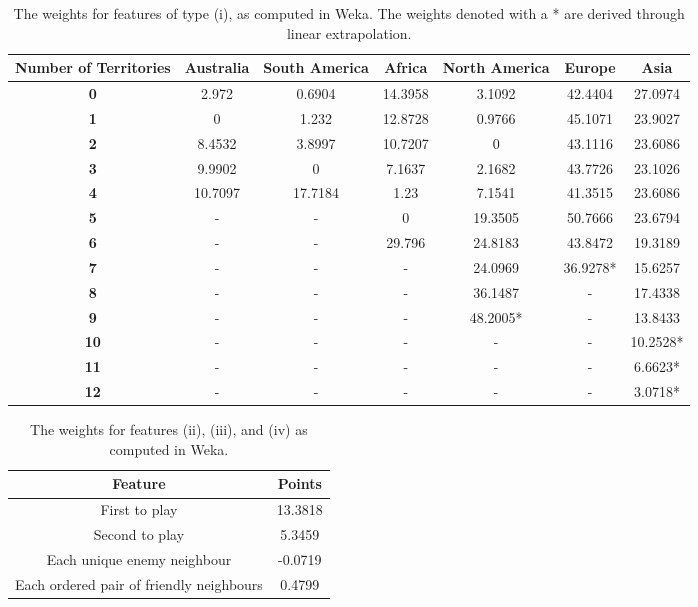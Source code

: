 \documentclass[letterpaper]{article}
\numberwithin{equation}{section}
\numberwithin{theorem}{section}
\numberwithin{lemma}{section}
\numberwithin{df}{section}
\begin{document}
\begin{table}[t]
  \begin{center} 
   \caption{The weights for features of type (i), as computed in Weka.  The weights denoted with a * are derived through linear extrapolation.}
    \label{tab:ContScoring}
    \begin{tabular}{|c|c|c|c|c|c|c|}
    	\hline
    	\bf Number of Territories & \bf Australia & \bf South America & \bf Africa & \bf North America & \bf Europe & \bf Asia \\
    	\hline
    	\bf 0 & 2.972 & 0.6904 & 14.3958 & 3.1092 & 42.4404 & 27.0974 \\
    	\hline
    	\bf 1 & 0 & 1.232 & 12.8728 & 0.9766 & 45.1071 & 23.9027 \\
    	\hline
    	\bf 2 & 8.4532 & 3.8997 & 10.7207 & 0 & 43.1116 & 23.6086 \\
    	\hline
    	\bf 3 & 9.9902 & 0 & 7.1637 & 2.1682 & 43.7726 & 23.1026 \\
    	\hline
    	\bf 4 & 10.7097 & 17.7184 & 1.23 & 7.1541 & 41.3515 & 23.6086 \\
    	\hline
    	\bf 5 & - & - & 0 & 19.3505 & 50.7666 & 23.6794 \\
    	\hline
    	\bf 6 & - & - & 29.796 & 24.8183 & 43.8472 & 19.3189 \\
    	\hline
    	\bf 7 & - & - & - & 24.0969 & 36.9278* & 15.6257 \\
    	\hline
    	\bf 8 & - & - & - & 36.1487 & - & 17.4338 \\
    	\hline
    	\bf 9 & - & - & - & 48.2005* & - & 13.8433 \\
    	\hline
    	\bf 10 & - & - & - & - & - & 10.2528* \\
    	\hline
    	\bf 11 & - & - & - & - & - & 6.6623* \\
    	\hline
    	\bf 12 & - & - & - & - & - & 3.0718* \\
    	\hline
    \end{tabular}
  \end{center}
\end{table}

\begin{table}[t]
	\begin{center}
		\caption{The weights for features (ii), (iii), and (iv) as computed in Weka.} 
		\label{tab:MoreScoring}
		\begin{tabular}{|c|c|}
			\hline
			\textbf{Feature} & \textbf{Points} \\
			\hline
			First to play & 13.3818 \\
			\hline
			Second to play & 5.3459 \\
			\hline
			Each unique enemy neighbour & -0.0719 \\
			\hline
			Each ordered pair of friendly neighbours & 0.4799 \\
			\hline
		\end{tabular}
	\end{center}
\end{table}
\end{document}
